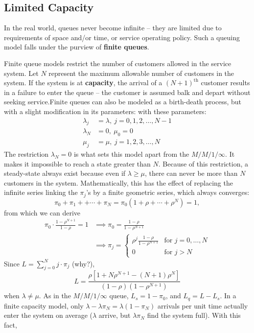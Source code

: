 \subsection{Limited Capacity}
In the real world, queues never become infinite -- they are limited due to requirements of {space} and/or {time}, or service operating policy. Such a queuing model falls under the purview of \textbf{finite queues}. \par Finite queue models restrict the number of customers allowed in the service system. Let $N$ represent the maximum allowable number of customers in the system. If the system is at \textbf{capacity}, the arrival of a $(N+1)^{\textrm{th}}$ customer results in a failure to enter the queue -- the customer is assumed balk and depart without seeking service.\newl Finite queues can also be modeled as a birth-death process, but with a slight modification in its parameters:  with these parameters:
\begin{align*}
\lambda_{j} &= \lambda, \ j=0,1,2,\ldots,N-1 \\ 
\lambda_{N} &= 0,\ \mu_{0} = 0 \\
\mu_{j} &= \mu,\  j=1,2,3,\ldots, N 
\end{align*}
The restriction $\lambda_{N} = 0$ is what sets this model apart from the $M/M/1/\infty$. It makes it impossible to reach a state greater than $N$. Because of this restriction, a steady-state always exist because even if $\lambda \geq \mu$, there can never be more than $N$ customers in the system.
\newl Mathematically, this has the effect of replacing the infinite series linking the $\pi_j$'s by a finite geometric series, which always converges: 
$$ \pi_{0}+\pi_1 + +\cdots + \pi_N = \pi_0(1+\rho+\cdots +\rho^{N}) = 1,$$ from which we can derive \begin{align*}\pi_{0}\cdot \frac{1-\rho^{N+1}}{1-\rho} = 1 &\implies \pi_0 = \frac{1-\rho}{1-\rho^{N+1}} \\ &\implies \pi_{j} = \begin{cases}\rho^{j} \frac{1-\rho}{1-\rho^{N+1}} & \text{for $j=0,\ldots,N$} \\ 0 & \text{for $j>N$}\end{cases}\end{align*}
Since $L = \sum^{N}_{j=0} j\cdot \pi_{j}$ (why?), 
$$L = \frac{\rho [1+ N \rho^{N+1} - (N+1) \rho^{N} ]}{(1-\rho)\left(1-\rho^{N+1}\right)} $$
when $\lambda\neq\mu$. \newl As in the $M/M/1/\infty$ queue, $L_{s} = 1 - \pi_{0}$, and $L_{q} = L - L_{s}$.  \newpage\noindent In a finite capacity model, only $\lambda - \lambda \pi_{N} = \lambda\left(1-\pi_{N}\right)$ arrivals per unit time  actually enter the system on average ($\lambda$ arrive, but $\lambda\pi_N$ find the system full). With this fact, 

